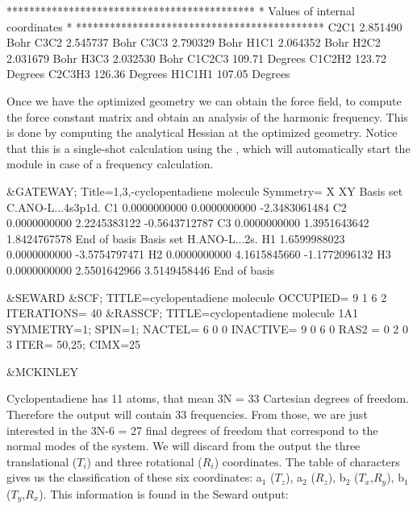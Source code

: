 \begin{sourcelisting}
 ********************************************
 * Values of internal coordinates           *
 ********************************************
 C2C1   2.851490 Bohr
 C3C2   2.545737 Bohr
 C3C3   2.790329 Bohr
 H1C1   2.064352 Bohr  
 H2C2   2.031679 Bohr  
 H3C3   2.032530 Bohr
 C1C2C3     109.71 Degrees
 C1C2H2     123.72 Degrees
 C2C3H3     126.36 Degrees
 H1C1H1     107.05 Degrees
\end{sourcelisting}

Once we have the optimized geometry we can obtain the
force field, to compute the force constant matrix and
obtain an analysis of the harmonic frequency. This is done by
computing the analytical Hessian at the optimized geometry.
Notice that this is a single-shot calculation using the
, which will automatically start the  module
in case of a frequency calculation.


\begin{inputlisting}
 &GATEWAY; Title=1,3,-cyclopentadiene molecule
   Symmetry= X XY
   Basis set
   C.ANO-L...4s3p1d.
     C1             0.0000000000        0.0000000000       -2.3483061484
     C2             0.0000000000        2.2245383122       -0.5643712787
     C3             0.0000000000        1.3951643642        1.8424767578
   End of basis
   Basis set
   H.ANO-L...2s.
     H1             1.6599988023        0.0000000000       -3.5754797471
     H2             0.0000000000        4.1615845660       -1.1772096132
     H3             0.0000000000        2.5501642966        3.5149458446
   End of basis

 &SEWARD
 &SCF; TITLE=cyclopentadiene molecule
   OCCUPIED= 9 1 6 2
   ITERATIONS= 40
 &RASSCF; TITLE=cyclopentadiene molecule 1A1
   SYMMETRY=1; SPIN=1; NACTEL= 6    0    0
   INACTIVE= 9    0    6    0
   RAS2    = 0    2    0    3
   ITER= 50,25; CIMX=25

 &MCKINLEY
\end{inputlisting}

Cyclopentadiene has 11 atoms, that mean 3N = 33 Cartesian degrees of freedom. 
Therefore the  output will contain 33 frequencies. From those,
we are just interested in the 3N-6 = 27 final degrees of freedom that
correspond to the normal modes of the system. We will discard from the
output the three translational ($T_i$) and three rotational ($R_i$) coordinates. 
The table of characters gives us the classification of these six coordinates:
a$_1$ ($T_z$), a$_2$ ($R_z$), b$_2$ ($T_x$,$R_y$), b$_1$ ($T_y$,$R_x$).
This information is found in the Seward output:

